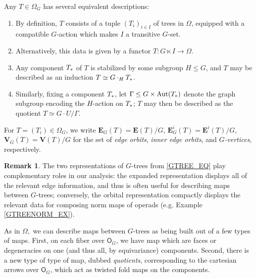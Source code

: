 \documentclass[a4paper,10pt
,draft
]{article}%
\numberwithin{equation}{section}
\numberwithin{figure}{section}
\theoremstyle{definition} %
\newtheorem{remark}[equation]{Remark}%
\DeclareMathOperator{\Aut}{Aut}%
\newcommand{\1}{\ensuremath{\mathbbm 1}}%
\begin{document}
Any $T \in \Omega_G$ has several equivalent descriptions:
\begin{enumerate}[label = (\roman*)]
\item By definition, $T$ consists of a tuple $(T_i)_{i \in I}$ of trees in $\Omega$, equipped with a compatible $G$-action
      which makes $I$ a transitive $G$-set.
\item Alternatively, this data is given by a functor $T: G \ltimes I \to \Omega$.
\item Any component $T_{\**}$ of $T$ is stabilized by some subgroup $H \leq G$, and $T$ may be described as an induction
      $T \simeq G \cdot_H T_{\**}$.
\item Similarly, fixing a component $T_{\**}$, let $\Gamma \leq G \times \Aut(T_{\**})$ denote the graph subgroup encoding the $H$-action on $T_{\**}$;
      $T$ may then be described as the quotient $T \simeq G \cdot U / \Gamma$.
\end{enumerate}



For $T = (T_i) \in \Omega_G$, we write
$\boldsymbol{E}_G(T) = \boldsymbol{E}(T)/G$, $\boldsymbol{E}^i_G(T) = \boldsymbol{E}^i(T)/G$, $\boldsymbol{V}_G(T) = \boldsymbol{V}(T)/G$
for the set of \textit{edge orbits}, \textit{inner edge orbits}, and \textit{$G$-vertices}, respectively.

\begin{remark}
      The two representations of $G$-trees from \eqref{GTREE_EQ} play complementary roles in our analysis:
      the expanded representation displays all of the relevant edge information, and thus is often useful for describing maps between $G$-trees;
      conversely, the orbital representation compactly displays the relevant data for composing norm maps of operads (e.g. Example \ref{GTREENORM_EX}).
\end{remark}

As in $\Omega,$ we can describe maps between $G$-trees as being built out of a few types of maps.
First, on each fiber over $\mathsf O_G$, we have map which are faces or degeneracies on one (and thus all, by equivariance) components.
Second, there is a new type of type of map, dubbed \textit{quotients}, corresponding to the cartesian arrows over $\mathsf O_G$,
which act as twisted fold maps on the components.
\end{document}
